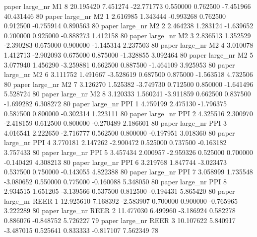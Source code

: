               paper   large_nr       M1                 8 20.195420  7.451274 -22.771773 0.550000 0.762500 -7.451966   40.431446 80
              paper   large_nr       M2                 1  2.616985  1.343444  -0.993268 0.762500 0.912500 -0.755914    0.890563 80
              paper   large_nr       M2                 2  2.464238  1.283124  -1.639652 0.700000 0.925000 -0.888273    1.412158 80
              paper   large_nr       M2                 3  2.836513  1.352529  -2.390283 0.675000 0.900000 -1.145314    2.237503 80
              paper   large_nr       M2                 4  3.010078  1.412713  -2.902093 0.675000 0.875000 -1.328855    3.092464 80
              paper   large_nr       M2                 5  3.077940  1.456290  -3.259881 0.662500 0.887500 -1.464109    3.925953 80
              paper   large_nr       M2                 6  3.111752  1.491667  -3.528619 0.687500 0.875000 -1.563518    4.732506 80
              paper   large_nr       M2                 7  3.126270  1.525382  -3.749730 0.712500 0.850000 -1.641496    5.528724 80
              paper   large_nr       M2                 8  3.120333  1.560241  -3.911859 0.662500 0.837500 -1.699282    6.308272 80
              paper   large_nr      PPI                 1  4.759199  2.475130  -1.796375 0.587500 0.800000 -0.302314    1.223111 80
              paper   large_nr      PPI                 2  4.325516  2.300970  -2.418159 0.612500 0.800000 -0.270489    2.186601 80
              paper   large_nr      PPI                 3  4.016541  2.222650  -2.716777 0.562500 0.800000 -0.197951    3.018360 80
              paper   large_nr      PPI                 4  3.770181  2.147262  -2.900472 0.525000 0.737500 -0.163182    3.757433 80
              paper   large_nr      PPI                 5  3.457434  2.000957  -2.959326 0.525000 0.700000 -0.140429    4.308213 80
              paper   large_nr      PPI                 6  3.219768  1.847744  -3.023473 0.537500 0.750000 -0.143055    4.822388 80
              paper   large_nr      PPI                 7  3.058999  1.735548  -3.080652 0.550000 0.775000 -0.160088    5.348050 80
              paper   large_nr      PPI                 8  2.934515  1.651205  -3.139566 0.537500 0.812500 -0.194431    5.865420 80
              paper   large_nr     REER                 1 12.925610  7.168392  -2.583907 0.700000 0.900000 -0.765965    3.222289 80
              paper   large_nr     REER                 2 11.477030  6.499960  -3.186924 0.582278 0.886076 -0.848752    5.726227 79
              paper   large_nr     REER                 3 10.107622  5.840917  -3.487015 0.525641 0.833333 -0.817107    7.562349 78
